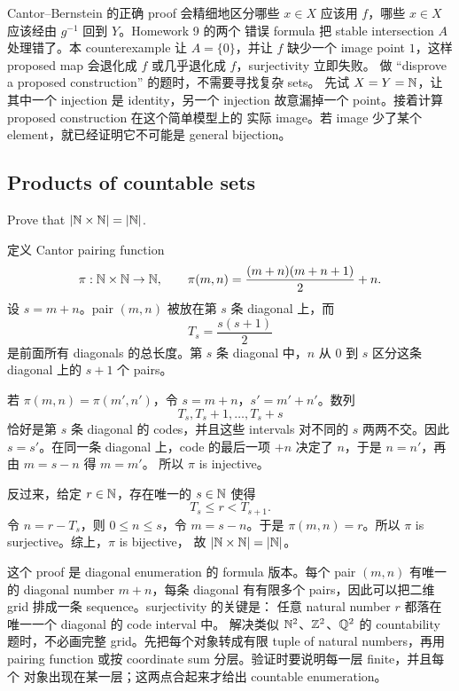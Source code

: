 \begin{explanation}
Cantor--Bernstein 的正确 proof 会精细地区分哪些 \(x\in X\) 应该用
\(f\)，哪些 \(x\in X\) 应该经由 \(g^{-1}\) 回到 \(Y\)。Homework 9 的两个
错误 formula 把 stable intersection \(A\) 处理错了。本 counterexample
让 \(A=\{0\}\)，并让 \(f\) 缺少一个 image point \(1\)，这样 proposed map
会退化成 \(f\) 或几乎退化成 \(f\)，surjectivity 立即失败。
做 ``disprove a proposed construction'' 的题时，不需要寻找复杂 sets。
先试 \(X=Y=\mathbb{N}\)，让其中一个 injection 是 identity，另一个 injection
故意漏掉一个 point。接着计算 proposed construction 在这个简单模型上的
实际 image。若 image 少了某个 element，就已经证明它不可能是 general
bijection。
\end{explanation}

\subsection{Products of countable sets}

\begin{exerciseblock}
Prove that \(\left|\mathbb{N}\times\mathbb{N}\right|=\left|\mathbb{N}\right|\).
\end{exerciseblock}

\begin{solution}
定义 Cantor pairing function
\[
  \pi:\mathbb{N}\times\mathbb{N}\to\mathbb{N},\qquad
  \pi(m,n)=\frac{(m+n)(m+n+1)}{2}+n.
\]
设 \(s=m+n\)。pair \((m,n)\) 被放在第 \(s\) 条 diagonal 上，而
\[
  T_s=\frac{s(s+1)}{2}
\]
是前面所有 diagonals 的总长度。第 \(s\) 条 diagonal 中，\(n\) 从
\(0\) 到 \(s\) 区分这条 diagonal 上的 \(s+1\) 个 pairs。

若 \(\pi(m,n)=\pi(m',n')\)，令 \(s=m+n\)，\(s'=m'+n'\)。数列
\[
  T_s,T_s+1,\ldots,T_s+s
\]
恰好是第 \(s\) 条 diagonal 的 codes，并且这些 intervals 对不同的
\(s\) 两两不交。因此 \(s=s'\)。在同一条 diagonal 上，code 的最后一项
\(+n\) 决定了 \(n\)，于是 \(n=n'\)，再由 \(m=s-n\) 得 \(m=m'\)。
所以 \(\pi\) is injective。

反过来，给定 \(r\in\mathbb{N}\)，存在唯一的 \(s\in\mathbb{N}\) 使得
\[
  T_s\le r<T_{s+1}.
\]
令 \(n=r-T_s\)，则 \(0\le n\le s\)，令 \(m=s-n\)。于是
\(\pi(m,n)=r\)。所以 \(\pi\) is surjective。综上，\(\pi\) is bijective，
故 \(\left|\mathbb{N}\times\mathbb{N}\right|=\left|\mathbb{N}\right|\)。
\end{solution}

\begin{explanation}
这个 proof 是 diagonal enumeration 的 formula 版本。每个 pair
\((m,n)\) 有唯一的 diagonal number \(m+n\)，每条 diagonal 有有限多个
pairs，因此可以把二维 grid 排成一条 sequence。surjectivity 的关键是：
任意 natural number \(r\) 都落在唯一一个 diagonal 的 code interval 中。
解决类似 \(\mathbb{N}^2\)、\(\mathbb{Z}^2\)、\(\mathbb{Q}^2\) 的 countability 题时，不必画完整
grid。先把每个对象转成有限 tuple of natural numbers，再用 pairing
function 或按 coordinate sum 分层。验证时要说明每一层 finite，并且每个
对象出现在某一层；这两点合起来才给出 countable enumeration。
\end{explanation}

